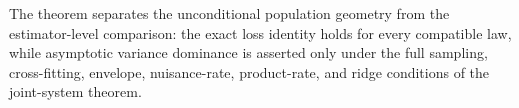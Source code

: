 The theorem separates the unconditional population geometry from the estimator-level comparison: the exact loss identity holds for every compatible law, while asymptotic variance dominance is asserted only under the full sampling, cross-fitting, envelope, nuisance-rate, product-rate, and ridge conditions of the joint-system theorem.